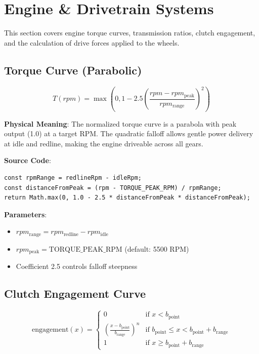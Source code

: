 \section{Engine \& Drivetrain Systems}

This section covers engine torque curves, transmission ratios, clutch engagement, and the calculation of drive forces applied to the wheels.

\subsection{Torque Curve (Parabolic)}

\begin{equation}
  T(rpm) = \max\left(0, 1 - 2.5 \left(\frac{rpm - rpm_{\text{peak}}}{rpm_{\text{range}}}\right)^2\right)
  \label{eq:torque-curve}
\end{equation}

\textbf{Physical Meaning}: The normalized torque curve is a parabola with peak output (1.0) at a target RPM. The quadratic falloff allows gentle power delivery at idle and redline, making the engine driveable across all gears.

\textbf{Source Code}: 

\begin{lstlisting}[caption={Parabolic torque curve}]
const rpmRange = redlineRpm - idleRpm;
const distanceFromPeak = (rpm - TORQUE_PEAK_RPM) / rpmRange;
return Math.max(0, 1.0 - 2.5 * distanceFromPeak * distanceFromPeak);
\end{lstlisting}

\textbf{Parameters}:
\begin{itemize}
  \item $rpm_{\text{range}} = rpm_{\text{redline}} - rpm_{\text{idle}}$
  \item $rpm_{\text{peak}} = \mathrm{TORQUE\_PEAK\_RPM}$ (default: 5500 RPM)
  \item Coefficient 2.5 controls falloff steepness
\end{itemize}

\subsection{Clutch Engagement Curve}

\begin{equation}
  \text{engagement}(x) = \begin{cases}
    0 & \text{if } x < b_{\text{point}} \\
    \left(\frac{x - b_{\text{point}}}{b_{\text{range}}}\right)^n & \text{if } b_{\text{point}} \leq x < b_{\text{point}} + b_{\text{range}} \\
    1 & \text{if } x \geq b_{\text{point}} + b_{\text{range}}
  \end{cases}
  \label{eq:clutch-engagement}
\end{equation}

